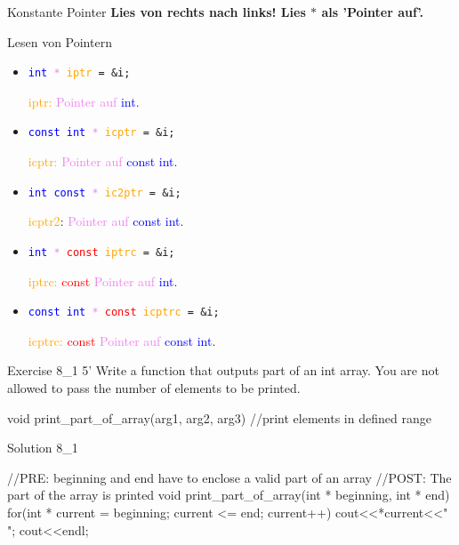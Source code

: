 \ifnum\conditionmacro=1 \documentclass[handout,usenames,dvipsnames]{beamer}\fi
\begin{document}
\begin{frame}[fragile]{Konstante Pointer}
\textbf{Lies von rechts nach links! Lies $*$ als 'Pointer auf'.}
\begin{block}{Lesen von Pointern}
\begin{itemize}
\item \texttt{\textcolor{blue}{int} \textcolor{violet}{*} \textcolor{orange}{iptr} = \&i;}

\textcolor{orange}{iptr:} \textcolor{violet}{Pointer auf} \textcolor{blue}{int}.
\item \texttt{\textcolor{blue}{const int}\textcolor{violet}{ *} \textcolor{orange}{icptr} = \&i;}

\textcolor{orange}{icptr:} \textcolor{violet}{Pointer auf} \textcolor{blue}{const int}.
\item \texttt{\textcolor{blue}{int const} \textcolor{violet}{*} \textcolor{orange}{ic2ptr} = \&i;}

\textcolor{orange}{icptr2}: \textcolor{violet}{Pointer auf} \textcolor{blue}{const int}.
\item \texttt{\textcolor{blue}{int} \textcolor{violet}{*} \textcolor{red}{const} \textcolor{orange}{iptrc} = \&i;}

\textcolor{orange}{iptrc:} \textcolor{red}{const} \textcolor{violet}{Pointer auf} \textcolor{blue}{int}.
\item \texttt{\textcolor{blue}{const int} \textcolor{violet}{*} \textcolor{red}{const} \textcolor{orange}{icptrc} = \&i;}

\textcolor{orange}{icptrc:} \textcolor{red}{const} \textcolor{violet}{Pointer auf} \textcolor{blue}{const int}.
\end{itemize}
\end{block}
\end{frame}

\begin{frame}[fragile]{Exercise 8\_1 5'}
Write a function that outputs part of an int array. You are not allowed to pass the number of elements to be printed.

\begin{TPCpp}
void print_part_of_array(arg1, arg2, arg3){
	//print elements in defined range
}
\end{TPCpp}
\end{frame}

\begin{frame}[fragile]{Solution 8\_1}
\begin{TFCpp}
//PRE: beginning and end have to enclose a valid part of an array
//POST: The part of the array is printed
void print_part_of_array(int * beginning, int * end){
	for(int * current = beginning; current <= end; current++){
		cout<<*current<<" ";
	}
	cout<<endl;
}
\end{TFCpp}
\end{frame}
\end{document}
